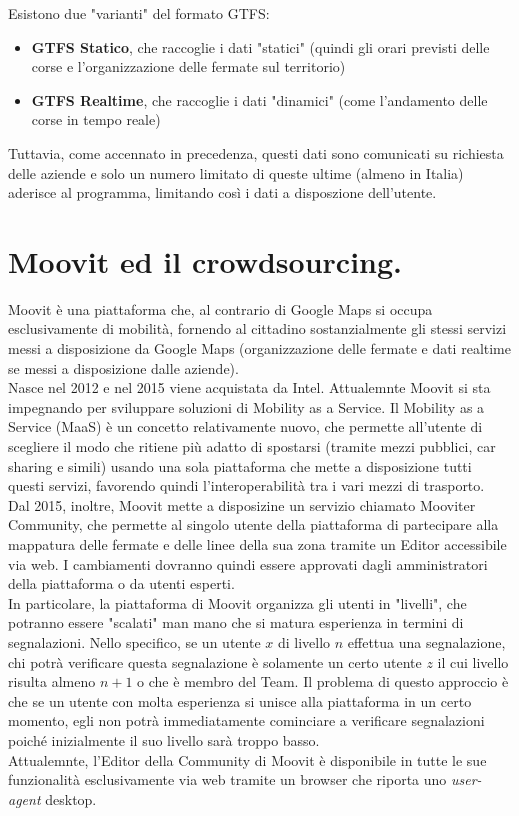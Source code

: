     Esistono due "varianti" del formato GTFS:
    \begin{itemize}
        \item \textbf{GTFS Statico}, che raccoglie i dati "statici" (quindi gli orari previsti delle corse e l'organizzazione delle fermate sul territorio)
        \item \textbf{GTFS Realtime}, che raccoglie i dati "dinamici" (come l'andamento delle corse in tempo reale)
    \end{itemize}

    Tuttavia, come accennato in precedenza, questi dati sono comunicati su richiesta delle aziende e solo un numero limitato di queste ultime (almeno in Italia) aderisce al programma, limitando così i dati a disposzione dell'utente.

\section{Moovit ed il crowdsourcing.}
    Moovit è una piattaforma che, al contrario di Google Maps si occupa esclusivamente di mobilità, fornendo al cittadino sostanzialmente gli stessi servizi messi a disposizione da Google Maps (organizzazione delle fermate e dati realtime se messi a disposizione dalle aziende). \\
    Nasce nel 2012 e nel 2015 viene acquistata da Intel. Attualemnte Moovit si sta impegnando per sviluppare soluzioni di Mobility as a Service.
    Il Mobility as a Service (MaaS) è un concetto relativamente nuovo, che permette all'utente di scegliere il modo che ritiene più adatto di spostarsi (tramite mezzi pubblici, car sharing e simili) usando una sola piattaforma che mette a disposizione tutti questi servizi, favorendo quindi l'interoperabilità tra i vari mezzi di trasporto. \\

    Dal 2015, inoltre, Moovit mette a disposizine un servizio chiamato Mooviter Community, che permette al singolo utente della piattaforma di partecipare alla mappatura delle fermate e delle linee della sua zona tramite un Editor accessibile via web. I cambiamenti dovranno quindi essere approvati dagli amministratori della piattaforma o da utenti esperti. \\

    In particolare, la piattaforma di Moovit organizza gli utenti in "livelli", che potranno essere "scalati" man mano che si matura esperienza in termini di segnalazioni. Nello specifico, se un utente $x$ di livello $n$ effettua una segnalazione, chi potrà verificare questa segnalazione è solamente un certo utente $z$ il cui livello risulta almeno $n + 1$ o che è membro del Team. Il problema di questo approccio è che se un utente con molta esperienza si unisce alla piattaforma in un certo momento, egli non potrà immediatamente cominciare a verificare segnalazioni poiché inizialmente il suo livello sarà troppo basso.\\
    Attualemnte, l'Editor della Community di Moovit è disponibile in tutte le sue funzionalità esclusivamente via web tramite un browser che riporta uno \textit{user-agent} desktop. \\

